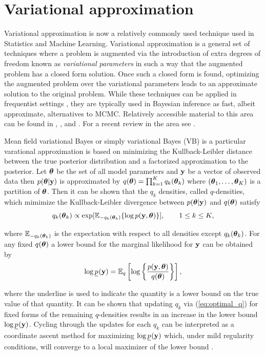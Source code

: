 \section{Variational approximation}
\label{sec:vb}

Variational approximation is now a relatively commonly used technique used in Statistics
and Machine Learning. 
Variational approximation is a general set of techniques where a problem is 
augmented via the introduction of extra degrees of freedom known as {\it variational parameters}
in such a way that the augmented problem has a closed form solution. Once such a closed form is found, optimizing the augmented
problem over the variational parameters leads to an approximate solution to the original problem. 
While these techniques can be applied in frequentist settings 
\citep{Ormerod2012}, they are typically used in Bayesian inference as fast, albeit approximate,
alternatives to MCMC. Relatively accessible material to this area can be found in
\cite{Bishop2006}, \cite{Ormerod2010}, and \cite{Grimmer2011}. For a recent
review in the area see \cite{BleiEtal2017}.

Mean field variational Bayes or simply variational Bayes (VB) is a particular 
varational approximation is based on minimizing the Kullback-Leibler distance between the true posterior distribution and a factorized approximation to the posterior. Let ${\boldsymbol \theta}$ be the set of all model parameters and ${\bf y}$ be a vector of observed data then $p({\boldsymbol \theta}|{\bf y})$ is approximated by $q({\boldsymbol \theta}) = \prod_{k=1}^K q_k({\boldsymbol \theta}_k)$ where $({\boldsymbol \theta}_1,\ldots,{\boldsymbol \theta}_K)$ is a partition of ${\boldsymbol \theta}$. Then it can	be shown that the 
$q_k$ densities, called $q$-densities, which mimimize the Kullback-Leibler divergence between $p({\boldsymbol \theta}|{\bf y})$ and $q({\boldsymbol \theta})$ satisfy
\begin{equation}\label{eq:optimal_q}
\displaystyle q_k({\boldsymbol \theta}_k) \propto \exp[ {\mathbb E}_{-q_k({\boldsymbol \theta}_k)} \{ \log p({\bf y},{\boldsymbol \theta}) \}], \qquad 1\le k\le K,
\end{equation}

\noindent where
${\mathbb E}_{-q_k({\boldsymbol \theta}_k)}$ is the expectation with respect to all densities except $q_k({\boldsymbol \theta}_k)$. For any fixed $q({\boldsymbol \theta})$ a lower bound for the marginal likelihood for ${\bf y}$ can be obtained by 
$$
\displaystyle \log \underline{p}_{\mbox{\scriptsize }}({\bf y}) = {\mathbb E}_q\left[ \log \left\{ \frac{p({\bf y},{\boldsymbol \theta})}{q({\boldsymbol \theta})} \right\} \right],
$$ 

\noindent where the	underline is used to indicate the quantity is a lower bound on the true value of that quantity. It can be shown that updating $q_k$ via (\ref{eq:optimal_q}) for fixed forms of the remaining $q$-densities results in an increase in the lower bound $\log \underline{p}_{\mbox{\scriptsize }}({\bf y})$. Cycling through the updates	for each $q_k$ can be interpreted as a coordinate ascent method for maximizing $\log \underline{p}_{\mbox{\scriptsize }}({\bf y})$ which, under mild regularity conditions,  will converge to a local maximizer of the lower bound \citep{LuenbergerYe2008}. 

